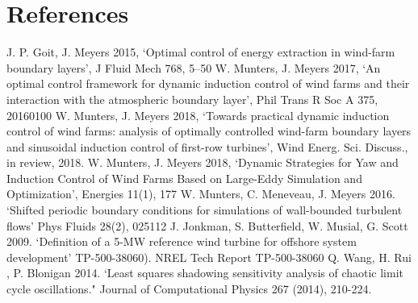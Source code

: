 \documentclass[a4paper]{jpconf}
\begin{document}
\section*{References}
\begin{thebibliography}{9}
	 J. P. Goit, J. Meyers 2015, `Optimal control of energy extraction in wind-farm boundary layers', J Fluid Mech 768, 5--50
	 W. Munters, J. Meyers 2017, `An optimal control framework for dynamic induction control of wind farms and their interaction with the atmospheric boundary layer', Phil Trans R Soc A 375, 20160100
	 W. Munters, J. Meyers 2018, `Towards practical dynamic induction control of wind farms: analysis of optimally controlled wind-farm boundary layers and sinusoidal induction control of first-row turbines', Wind Energ. Sci. Discuss., in review, 2018. 
	 W. Munters, J. Meyers 2018, `Dynamic Strategies for Yaw and Induction Control of Wind Farms Based on Large-Eddy Simulation and Optimization', Energies 11(1), 177
	 W. Munters, C. Meneveau, J. Meyers 2016. `Shifted periodic boundary conditions for simulations of wall-bounded turbulent flows' Phys Fluids 28(2), 025112
	 J. Jonkman, S. Butterfield, W. Musial, G. Scott 2009. `Definition of a 5-MW reference wind turbine for offshore system development' TP-500-38060). NREL Tech Report TP-500-38060
	 Q. Wang, H. Rui , P. Blonigan 2014. `Least squares shadowing sensitivity analysis of chaotic limit cycle oscillations." Journal of Computational Physics 267 (2014), 210-224.
\end{thebibliography}
\end{document}
